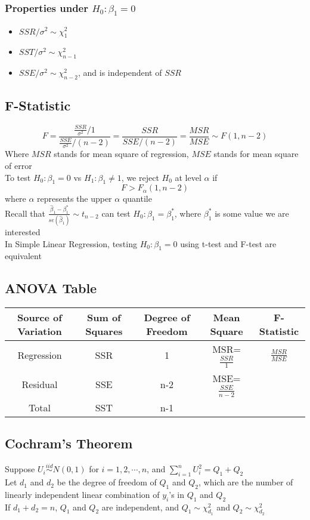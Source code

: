 \documentclass[11pt]{article}
\newcommand{\ds}{\displaystyle}
\begin{document}
\subsubsection{Properties under $H_0:\beta_1=0$}
\begin{itemize}
    \item $SSR/\sigma^2\sim\chi^2_1$
    \item $SST/\sigma^2\sim\chi^2_{n-1}$
    \item $SSE/\sigma^2\sim\chi^2_{n-2}$, and is independent of $SSR$
\end{itemize}
\subsection{F-Statistic}
\[F=\frac{\frac{SSR}{\sigma^2}/1}{\frac{SSE}{\sigma^2}/(n-2)}=\frac{SSR}{SSE/(n-2)}=\frac{MSR}{MSE}\sim F(1,n-2)\]
Where $MSR$ stands for mean square of regression, $MSE$ stands for mean square of error \\
To test $H_0:\beta_1=0$ vs $H_1:\beta_1\neq1$, we reject $H_0$ at level $\alpha$ if 
\[F>F_\alpha(1,n-2)\]
where $\alpha$ represents the upper $\alpha$ quantile \\
Recall that $\ds\frac{\hat{\beta}_1-\beta_1^*}{se(\hat{\beta}_1)}\sim t_{n-2}$ can test $H_0:\beta_1=\beta_1^*$, where $\beta_1^*$ is some value we are interested \\
In Simple Linear Regression, testing $H_0:\beta_1=0$ using t-test and F-test are equivalent
\subsection{ANOVA Table}
\begin{tabular}{c|c|c|c|c}
    Source of Variation & Sum of Squares & Degree of Freedom & Mean Square & F-Statistic \\ \hline
    Regression & SSR & 1 & MSR=$\frac{SSR}{1}$ & $\frac{MSR}{MSE}$ \\
    Residual & SSE & n-2 & MSE=$\frac{SSE}{n-2}$ & \\
    Total & SST & n-1 & &
\end{tabular}
\subsection{Cochram's Theorem}
Suppose $U_i\overset{iid}{\sim}N(0,1)$ for $i=1,2,\cdots,n$, and $\sum_{i=1}^{n}U_i^2=Q_1+Q_2$ \\
Let $d_1$ and $d_2$ be the degree of freedom of $Q_1$ and $Q_2$, which are the number of linearly 
independent linear combination of $y_i$'s in $Q_1$ and $Q_2$ \\
If $d_1+d_2=n$, $Q_1$ and $Q_2$ are independent, and $Q_1\sim\chi^2_{d_1}$ and $Q_2\sim\chi^2_{d_2}$
\end{document}
